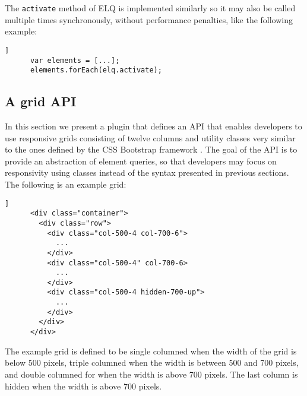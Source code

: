 \documentclass[]{llncs}
\newcommand{\code}[1]{\texttt{#1}}
\newcommand{\elq}{ELQ}
\begin{document}
    \noindent
    The \code{activate} method of \elq{} is implemented similarly so it may also be called multiple times synchronously, without performance penalties, like the following example:

    \begin{lstlisting}[gobble=6,label={},caption={},captionpos=b]]
      var elements = [...];
      elements.forEach(elq.activate);
    \end{lstlisting}

  \subsection{A grid API}\label{grid-api}
    In this section we present a plugin that defines an API that enables developers to use responsive grids consisting of twelve columns and utility classes very similar to the ones defined by the CSS Bootstrap framework \cite{bootstrap}.
    The goal of the API is to provide an abstraction of element queries, so that developers may focus on responsivity using classes instead of the syntax presented in previous sections.
    The following is an example grid:




    \begin{lstlisting}[gobble=8,caption={},captionpos=b,label={}]]
      <div class="container">
        <div class="row">
          <div class="col-500-4 col-700-6">
            ...
          </div>
          <div class="col-500-4" col-700-6>
            ...
          </div>
          <div class="col-500-4 hidden-700-up">
            ...
          </div>
        </div>
      </div>
    \end{lstlisting}

    \noindent
    The example grid is defined to be single columned when the width of the grid is below 500 pixels, triple columned when the width is between 500 and 700 pixels, and double columned for when the width is above 700 pixels.
    The last column is hidden when the width is above 700 pixels.
\end{document}
